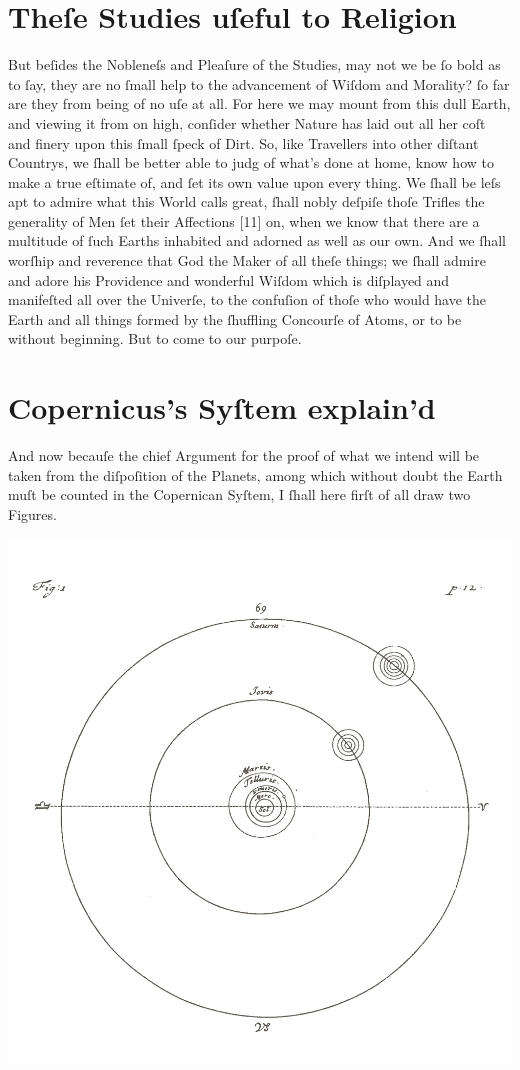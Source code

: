 \documentclass[letterpaper]{book}
\begin{document}
\section{Theſe Studies uſeful to Religion}

But beſides the Nobleneſs and Pleaſure of the Studies, may not we be ſo bold
as to ſay, they are no ſmall help to the advancement of Wiſdom and Morality?
ſo far are they from being of no uſe at all. For here we may mount from this
dull Earth, and viewing it from on high, conſider whether Nature has laid
out all her coſt and finery upon this ſmall ſpeck of Dirt.  So, like
Travellers into other diſtant Countrys, we ſhall be better able to judg of
what's done at home, know how to make a true eſtimate of, and ſet its own
value upon every thing. We ſhall be leſs apt to admire what this World calls
great, ſhall nobly deſpiſe thoſe Trifles the generality of Men ſet their
Affections [11] on, when we know that there are a multitude of ſuch Earths
inhabited and adorned as well as our own. And we ſhall worſhip and reverence
that God the Maker of all theſe things; we ſhall admire and adore his
Providence and wonderful Wiſdom which is diſplayed and manifeſted all over
the Univerſe, to the confuſion of thoſe who would have the Earth and all
things formed by the ſhuffling Concourſe of Atoms, or to be without
beginning. But to come to our purpoſe.


\section{Copernicus's Syſtem explain'd}

And now becauſe the chief Argument for the proof of what we intend will be
taken from the diſpoſition of the Planets, among which without doubt the
Earth muſt be counted in the Copernican Syſtem, I ſhall here firſt of all
draw two Figures. 

\begin{center}
	\includegraphics[width=.90 \textwidth]{Images/ct_1_en.jpg}
\end{center}
\end{document}
